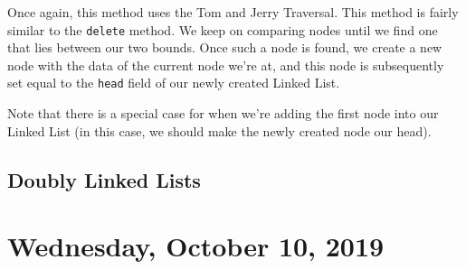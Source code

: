 Once again, this method uses the Tom and Jerry Traversal. This method is fairly similar to the \verb!delete! method. We keep on comparing nodes until we find one that lies between our two bounds. Once such a node is found, we create a new node with the data of the current node we're at, and this node is subsequently set equal to the \verb!head! field of our newly created Linked List. 

Note that there is a special case for when we're adding the first node into our Linked List (in this case, we should make the newly created node our head). 

\subsection{Doubly Linked Lists} 

\section{Wednesday, October 10, 2019}